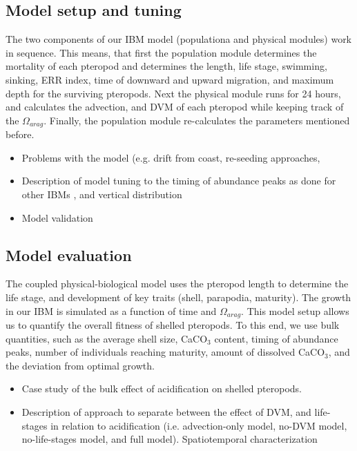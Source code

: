 \subsection{Model setup and tuning}

The two components of our IBM model (populationa and physical modules) work in sequence. This means, that first the population module determines the mortality of each pteropod and determines the length, life stage, swimming, sinking, ERR index, time of downward and upward migration, and maximum depth for the surviving pteropods. Next the physical module runs for 24 hours, and calculates the advection, and DVM of each pteropod while keeping track of the $\Omega_{arag}$. Finally, the population module re-calculates the parameters mentioned before.


\begin{itemize}
    \item Problems with the model (e.g. drift from coast, re-seeding approaches,    
    \item Description of model tuning to the timing of abundance peaks as done for other IBMs \citep[e.g. ][]{Miller1998CalanusIBM}, and vertical distribution
    \item Model validation
\end{itemize}  

\subsection{Model evaluation}

The coupled physical-biological model uses the pteropod length to determine the life stage, and development of key traits (shell, parapodia, maturity). The growth in our IBM is simulated as a function of time and $\Omega_{arag}$. This model setup allows us to quantify the overall fitness of shelled pteropods. To this end, we use bulk quantities, such as the average shell size, CaCO$_3$ content, timing of abundance peaks, number of individuals reaching maturity, amount of dissolved CaCO$_3$, and the deviation from optimal growth.

    \begin{itemize}
        \item Case study of the bulk effect of acidification on shelled pteropods.
        \item Description of approach to separate between the effect of DVM, and life-stages in relation to acidification (i.e. advection-only model, no-DVM model, no-life-stages model, and full model). Spatiotemporal characterization
    
    \end{itemize}





